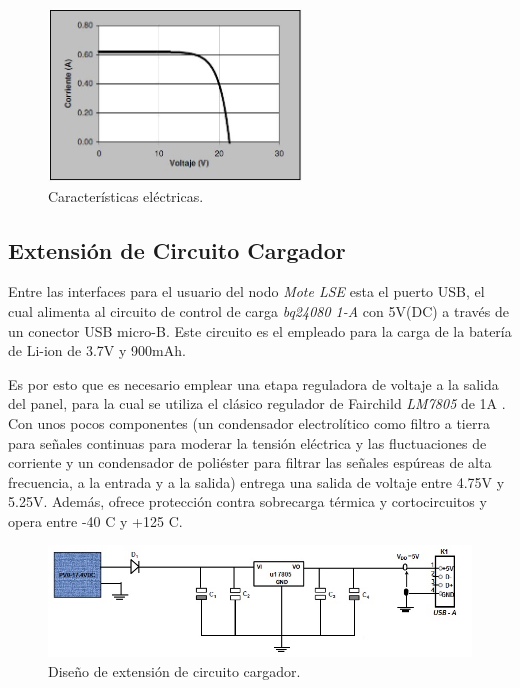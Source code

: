 {%

\begin{figure}[h!]
	\centering
    \includegraphics[width=0.6\textwidth]{./Figures/curva.JPG}
    	\caption{Características eléctricas.}
	\label{fig:curva}
\end{figure}

\clearpage
\subsection{Extensión de Circuito Cargador}
\label{subsec:extensión}
Entre las interfaces para el usuario del nodo \textit{Mote LSE} esta el puerto USB, el cual alimenta al circuito de control de carga \textit{bq24080 1-A} con 5V(DC) a través de un conector USB micro-B. Este circuito es el empleado para la carga de la batería de Li-ion de 3.7V y 900mAh.

Es por esto que es necesario emplear una etapa reguladora de voltaje a la salida del panel, para la cual se utiliza el clásico regulador de Fairchild \textit{LM7805} de 1A \citep{7805}. Con unos pocos componentes (un condensador electrolítico como filtro a tierra para señales continuas para moderar la tensión eléctrica y las fluctuaciones de corriente y un condensador de poliéster para filtrar las señales espúreas de alta frecuencia, a la entrada y a la salida) entrega una salida de voltaje entre 4.75V y 5.25V. Además, ofrece protección contra sobrecarga térmica y cortocircuitos y opera entre -40 \grados C y +125 \grados C.

\begin{figure}[h!]
	\centering
    \includegraphics[width=1\textwidth]{./Figures/circuito.jpg}
    	\caption{Diseño de extensión de circuito cargador.}
	\label{fig:circuito}
\end{figure}

}
